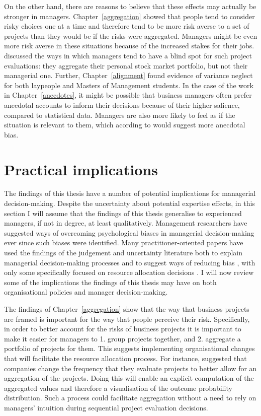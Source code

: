 \documentclass[a4paper, nobind, dvipsnames]{templates/ociamthesis}
\theoremstyle{definition}
\theoremstyle{definition}
\theoremstyle{definition}
\theoremstyle{definition}
\theoremstyle{remark}
\begin{document}
On the other hand, there are reasons to believe that these effects may actually
be stronger in managers. Chapter~\ref{aggregation} showed that people tend to
consider risky choices one at a time and therefore tend to be more risk averse
to a set of projects than they would be if the risks were aggregated. Managers
might be even more risk averse in these situations because of the increased
stakes for their jobs. \textcite{lovallo2020} discussed the ways in which managers tend to
have a blind spot for such project evaluations: they aggregate their personal
stock market portfolio, but not their managerial one. Further,
Chapter~\ref{alignment} found evidence of variance neglect for both laypeople
and Masters of Management students. In the case of the work in
Chapter~\ref{anecdotes}, it might be possible that business managers often
prefer anecdotal accounts to inform their decisions because of their higher
salience, compared to statistical data. Managers are also more likely to feel as
if the situation is relevant to them, which acording to \textcite{freling2020} would
suggest more anecdotal bias.

\section{Practical implications}

The findings of this thesis have a number of potential implications for
managerial decision-making. Despite the uncertainty about potential expertise
effects, in this section I will assume that the findings of this thesis
generalise to experienced managers, if not in degree, at least qualitatively.
Management researchers have suggested ways of overcoming psychological biases in
managerial decision-making ever since such biases were identified. Many
practitioner-oriented papers have used the findings of the judgement and
uncertainty literature both to explain managerial decision-making processes and
to suggest ways of reducing bias \autocite{lovallo2014,koller2012,hall2012,courtney1997,courtney2013,sibony2017}, with only some specifically focused
on resource allocation decisions \autocite{birshan2013}. I will now review some of the
implications the findings of this thesis may have on both organisational
policies and manager decision-making.

The findings of Chapter~\ref{aggregation} show that the way that business
projects are framed is important for the way that people perceive their risk.
Specifically, in order to better account for the risks of business projects it
is important to make it easier for managers to 1. group projects together,
and 2. aggregate a portfolio of projects for them. This suggests implementing
organisational changes that will facilitate the resource allocation process. For
instance, \textcite{lovallo2020} suggested that companies change the frequency that they
evaluate projects to better allow for an aggregation of the projects. Doing this
will enable an explicit computation of the aggregated values and therefore a
visualisation of the outcome probability distribution. Such a process could
facilitate aggregation without a need to rely on managers' intuition during
sequential project evaluation decisions.
\end{document}

